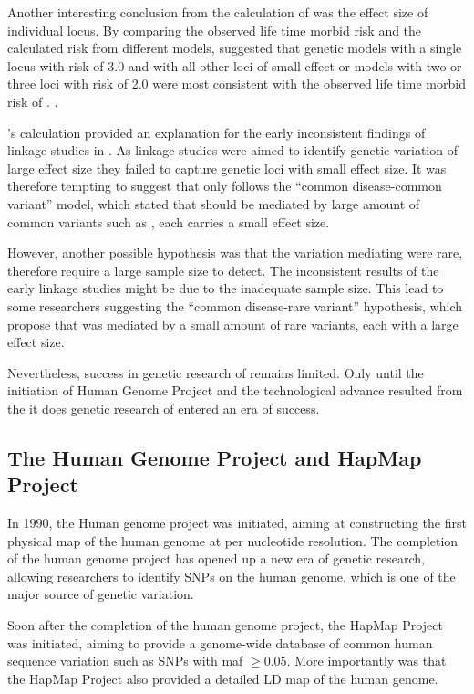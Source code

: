 	Another interesting conclusion from the calculation of \citet{Risch1990a} was the effect size of individual locus. 
	By comparing the observed life time morbid risk and the calculated risk from different models, \citeauthor{Risch1990a} 	suggested that genetic models with a single locus with risk of 3.0 and with all other loci of small effect or models with two or three loci with risk of 2.0 were most consistent with the observed life time morbid risk of .	\citep{Risch1990}.
	
	\citeauthor{Risch1990a}'s calculation provided an explanation for the early inconsistent findings of linkage studies in \citep{Harrison2005}.
	As linkage studies were aimed to identify genetic variation of large effect size they failed to capture genetic loci with small effect size.
	It was therefore tempting to suggest that  only follows the ``common disease-common variant'' model, which stated that  should be mediated by large amount of common variants such as , each carries a small effect size.
	
	However, another possible hypothesis was that the variation mediating  were rare, therefore require a large sample size to detect. 
	The inconsistent results of the early linkage studies might be due to the inadequate sample size. 
	This lead to some researchers suggesting the ``common disease-rare variant'' hypothesis, which propose that  was mediated by a small amount of rare variants, each with a large effect size\citep{McClellan2007}.
	
	Nevertheless, success in genetic research of  remains limited.
	Only until the initiation of Human Genome Project and the technological advance resulted from the it does genetic research of  entered an era of success.

	\subsection{The Human Genome Project and HapMap Project}
	In 1990, the Human genome project was initiated, aiming at constructing the first physical map of the human genome at per nucleotide resolution\citep{Lander2001}.
	The completion of the human genome project has opened up a new era of genetic research, allowing researchers to identify \glspl{SNP} on the human genome, which is one of the major source of genetic variation.
	
	Soon after the completion of the human genome project, the HapMap Project was initiated\citep{Consortium2005}, aiming to provide a genome-wide database of common human sequence variation such as \glspl{SNP} with \gls{maf} $\ge0.05$.
	More importantly was that the HapMap Project also provided a detailed \gls{LD} map of the human genome.
	
